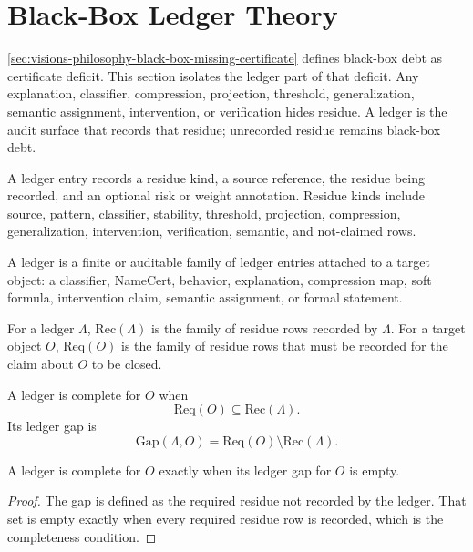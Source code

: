 \section{Black-Box Ledger Theory}
\label{sec:visions-philosophy-black-box-ledger-theory}

\autoref{sec:visions-philosophy-black-box-missing-certificate} defines
black-box debt as certificate deficit. This section isolates the ledger
part of that deficit. Any explanation, classifier, compression,
projection, threshold, generalization, semantic assignment, intervention,
or verification hides residue. A ledger is the audit surface that records
that residue; unrecorded residue remains black-box debt.

\begin{definition}
\label{def:philosophy-ledger-entry}
A ledger entry records a residue kind, a source reference, the residue
being recorded, and an optional risk or weight annotation. Residue kinds
include source, pattern, classifier, stability, threshold, projection,
compression, generalization, intervention, verification, semantic, and
not-claimed rows.
\end{definition}

\begin{definition}[Ledger]
\label{def:philosophy-ledger}
A ledger is a finite or auditable family of ledger entries attached to a
target object: a classifier, NameCert, behavior, explanation,
compression map, soft formula, intervention claim, semantic assignment,
or formal statement.
\end{definition}

\begin{definition}
\label{def:philosophy-recorded-required-residue}
For a ledger $\Lambda$, $\mathrm{Rec}(\Lambda)$ is the family of residue
rows recorded by $\Lambda$. For a target object $O$, $\mathrm{Req}(O)$ is
the family of residue rows that must be recorded for the claim about $O$
to be closed.
\end{definition}

\begin{definition}
\label{def:philosophy-ledger-completeness-gap}
A ledger is complete for $O$ when
$$
\mathrm{Req}(O)\subseteq\mathrm{Rec}(\Lambda).
$$
Its ledger gap is
$$
\mathrm{Gap}(\Lambda,O)
=
\mathrm{Req}(O)\setminus\mathrm{Rec}(\Lambda).
$$
\end{definition}

\begin{theorem}
\label{thm:philosophy-ledger-completeness-gap-free}
A ledger is complete for $O$ exactly when its ledger gap for $O$ is empty.
\end{theorem}
\begin{proof}
The gap is defined as the required residue not recorded by the ledger.
That set is empty exactly when every required residue row is recorded,
which is the completeness condition.
\end{proof}

